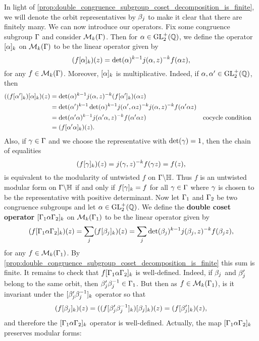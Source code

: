       In light of \cref{prop:double_congruence_subgroup_coset_decomposition_is_finite}, we will denote the orbit representatives by $\beta_{j}$ to make it clear that there are finitely many. We can now introduce our operators. Fix some congruence subgroup $\Gamma$ and consider $\mathcal{M}_{k}(\Gamma)$. Then for $\alpha \in \mathrm{GL}_{2}^{+}(\mathbb{Q})$, we define the operator $[\alpha]_{k}$ on $\mathcal{M}_{k}(\Gamma)$ to be the linear operator given by
      \[
        (f[\alpha]_{k})(z) = \det(\alpha)^{k-1}j(\alpha,z)^{-k}f(\alpha z),
      \]
      for any $f \in \mathcal{M}_{k}(\Gamma)$. Moreover, $[\alpha]_{k}$ is multiplicative. Indeed, if $\alpha,\alpha' \in \mathrm{GL}_{2}^{+}(\mathbb{Q})$, then
      \begin{align*}
        ((f[\alpha']_{k})[\alpha]_{k})(z) &= \det(\alpha)^{k-1}j(\alpha,z)^{-k}(f[\alpha']_{k})(\alpha z) \\
        &= \det(\alpha')^{k-1}\det(\alpha)^{k-1}j(\alpha',\alpha z)^{-k}j(\alpha,z)^{-k}f(\alpha'\alpha z) \\
        &= \det(\alpha'\alpha)^{k-1}j(\alpha'\alpha,z)^{-k}f(\alpha'\alpha z) && \text{cocycle condition} \\
        &= (f[\alpha'\alpha]_{k})(z).
      \end{align*}
      Also, if $\gamma \in \Gamma$ and we choose the representative with $\det(\gamma) = 1$, then the chain of equalities
      \[
        (f[\gamma]_{k})(z) = j(\gamma,z)^{-k}f(\gamma z) = f(z),
      \]
      is equivalent to the modularity of untwisted $f$ on $\Gamma\backslash\mathbb{H}$. Thus $f$ is an untwisted modular form on $\Gamma\backslash\mathbb{H}$ if and only if $f[\gamma]_{k} = f$ for all $\gamma \in \Gamma$ where $\gamma$ is chosen to be the representative with positive determinant. Now let $\Gamma_{1}$ and $\Gamma_{2}$ be two congruence subgroups and let $\alpha \in \mathrm{GL}_{2}^{+}(\mathbb{Q})$. We define the \textbf{double coset operator} $[\Gamma_{1}\alpha\Gamma_{2}]_{k}$ on $\mathcal{M}_{k}(\Gamma_{1})$ to be the linear operator given by
      \[
        (f[\Gamma_{1}\alpha\Gamma_{2}]_{k})(z) = \sum_{j}(f[\beta_{j}]_{k})(z) = \sum_{j}\det(\beta_{j})^{k-1}j(\beta_{j},z)^{-k}f(\beta_{j}z),
      \]
      for any $f \in \mathcal{M}_{k}(\Gamma_{1})$. By \cref{prop:double_congruence_subgroup_coset_decomposition_is_finite} this sum is finite. It remains to check that $f[\Gamma_{1}\alpha\Gamma_{2}]_{k}$ is well-defined. Indeed, if $\beta_{j}$ and $\beta_{j}'$ belong to the same orbit, then $\beta_{j}'\beta_{j}^{-1} \in \Gamma_{1}$. But then as $f \in \mathcal{M}_{k}(\Gamma_{1})$, is it invariant under the $[\beta_{j}'\beta_{j}^{-1}]_{k}$ operator so that
      \[
        (f[\beta_{j}]_{k})(z) = ((f[\beta_{j}'\beta_{j}^{-1}]_{k})[\beta_{j}]_{k})(z) = (f[\beta_{j}']_{k})(z),
      \]
      and therefore the $[\Gamma_{1}\alpha\Gamma_{2}]_{k}$ operator is well-defined. Actually, the map $[\Gamma_{1}\alpha\Gamma_{2}]_{k}$ preserves modular forms:

